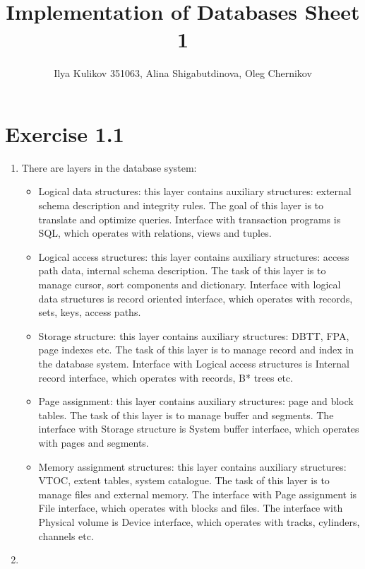 \documentclass[10pt]{article}
\title{Implementation of Databases Sheet 1}
\author{Ilya Kulikov 351063, Alina Shigabutdinova, Oleg Chernikov}
\begin{document}
  \maketitle
  \section*{Exercise 1.1}
  \begin{enumerate}[label=\arabic*.]
      \item
        There are layers in the database system:
        \begin{itemize}
          \item Logical data structures: this layer contains auxiliary structures:
          external schema description and integrity rules. The goal of this layer is
          to translate and optimize queries. Interface with transaction programs is
          SQL, which operates with relations, views and tuples.
          \item Logical access structures: this layer contains auxiliary structures:
          access path data, internal schema description. The task of this layer is to
          manage cursor, sort components and dictionary. Interface with logical data
          structures is record oriented interface, which operates with records, sets,
          keys, access paths.
          \item Storage structure: this layer contains auxiliary structures: DBTT, FPA,
          page indexes etc. The task of this layer is to manage record and index in the
          database system. Interface with Logical access structures is Internal record
          interface, which operates with records, B* trees etc.
          \item Page assignment: this layer contains auxiliary structures: page and
          block tables. The task of this layer is to manage buffer and segments. The
          interface with Storage structure is System buffer interface, which operates
          with pages and segments.
          \item Memory assignment structures: this layer contains auxiliary structures:
          VTOC, extent tables, system catalogue. The task of this layer is to manage files
          and external memory. The interface with Page assignment is File interface,
          which operates with blocks and files. The interface with Physical volume is
          Device interface, which operates with tracks, cylinders, channels etc.
        \end{itemize}
      \item

\end{enumerate}
\end{document}
